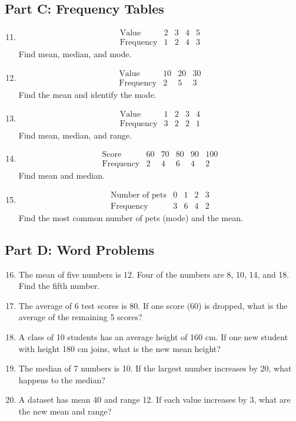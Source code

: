 \documentclass[14pt]{extarticle}
\begin{document}
\subsection*{Part C: Frequency Tables}
\begin{enumerate}
  \setcounter{enumi}{10}
  \item 
  \[
  \begin{array}{c|cccc}
  \text{Value} & 2 & 3 & 4 & 5\\ \hline
  \text{Frequency} & 1 & 2 & 4 & 3
  \end{array}
  \]
  Find mean, median, and mode.

  \item 
  \[
  \begin{array}{c|ccc}
  \text{Value} & 10 & 20 & 30\\ \hline
  \text{Frequency} & 2 & 5 & 3
  \end{array}
  \]
  Find the mean and identify the mode.

  \item 
  \[
  \begin{array}{c|cccc}
  \text{Value} & 1 & 2 & 3 & 4\\ \hline
  \text{Frequency} & 3 & 2 & 2 & 1
  \end{array}
  \]
  Find mean, median, and range.

  \item 
  \[
  \begin{array}{c|ccccc}
  \text{Score} & 60 & 70 & 80 & 90 & 100\\ \hline
  \text{Frequency} & 2 & 4 & 6 & 4 & 2
  \end{array}
  \]
  Find mean and median.

  \item 
  \[
  \begin{array}{c|cccc}
  \text{Number of pets} & 0 & 1 & 2 & 3\\ \hline
  \text{Frequency} & 3 & 6 & 4 & 2
  \end{array}
  \]
  Find the most common number of pets (mode) and the mean.
\end{enumerate}

\subsection*{Part D: Word Problems}
\begin{enumerate}
  \setcounter{enumi}{15}
  \item The mean of five numbers is 12. Four of the numbers are 8, 10, 14, and 18. Find the fifth number.
  \item The average of 6 test scores is 80. If one score (60) is dropped, what is the average of the remaining 5 scores?
  \item A class of 10 students has an average height of 160 cm. If one new student with height 180 cm joins, what is the new mean height?
  \item The median of 7 numbers is 10. If the largest number increases by 20, what happens to the median?
  \item A dataset has mean 40 and range 12. If each value increases by 3, what are the new mean and range?
\end{enumerate}
\end{document}
